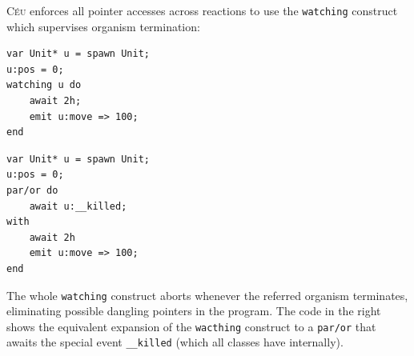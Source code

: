 \documentclass{acm_proc_article-sp}
\newcommand{\CEU}{\textsc{C\'{e}u}\xspace}
\newcommand{\code}[1] {{\small{\texttt{#1}}}}
\newcommand{\1}{\;}
\newcommand{\2}{\;\;}
\newcommand{\3}{\;\;\;}
\newcommand{\5}{\;\;\;\;\;}
\begin{document}
\CEU enforces all pointer accesses across reactions to use the \code{watching} 
construct which supervises organism termination:

\begin{minipage}[t]{0.48\linewidth}
\begin{lstlisting}
var Unit* u = spawn Unit;
u:pos = 0;
watching u do
    await 2h;
    emit u:move => 100;
end
\end{lstlisting}
\end{minipage}
%
\begin{minipage}[t]{0.48\linewidth}
\begin{lstlisting}
var Unit* u = spawn Unit;
u:pos = 0;
par/or do
    await u:__killed;
with
    await 2h
    emit u:move => 100;
end
\end{lstlisting}
\end{minipage}

The whole \code{watching} construct aborts whenever the referred organism 
terminates, eliminating possible dangling pointers in the program.
%
The code in the right shows the equivalent expansion of the \code{wacthing} 
construct to a \code{par/or} that awaits the special event \code{\_\_killed} 
(which all classes have internally).

\end{document}
